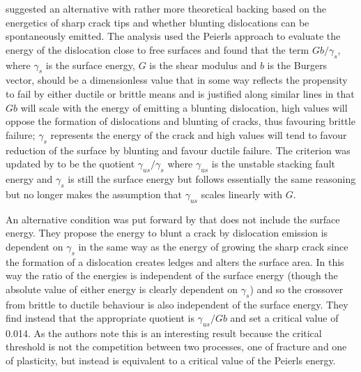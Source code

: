 


\citet{rice1974} suggested an alternative with rather more theoretical backing based on the energetics of sharp crack tips and whether blunting dislocations can be spontaneously emitted. The analysis used the Peierls approach to evaluate the energy of the dislocation close to free surfaces and found that the term $Gb/\gamma_s$, where $\gamma_s$ is the surface energy, $G$ is the shear modulus and $b$ is the Burgers vector, should be a dimensionless value that in some way reflects the propensity to fail by either ductile or brittle means and is justified along similar lines in that $Gb$ will scale with the energy of emitting a blunting dislocation, high values will oppose the formation of dislocations and blunting of cracks, thus favouring brittle failure; $\gamma_s$ represents the energy of the crack and high values will tend to favour reduction of the surface by blunting and favour ductile failure. The criterion was updated by \citet{Rice1992} to be the quotient $\gamma_{us}/ \gamma_s$ where $\gamma_{us}$ is the unstable stacking fault energy and $\gamma_s$ is still the surface energy but follows essentially the same reasoning but no longer makes the assumption that $\gamma_{us}$ scales linearly with $G$.

An alternative condition was put forward by \citet{Zhou1994} that does not include the surface energy. They propose the energy to blunt a crack by dislocation emission is dependent on $\gamma_s$ in the same way as the energy of growing the sharp crack since the formation of a dislocation creates ledges and alters the surface area. In this way the ratio of the energies is independent of the surface energy (though the absolute value of either energy is clearly dependent on $\gamma_s$) and so the crossover from brittle to ductile behaviour is also independent of the surface energy. They find instead that the appropriate quotient is $\gamma_{us} / Gb$ and set a critical value of 0.014. As the authors note this is an interesting result because the critical threshold is not the competition between two processes, one of fracture and one of plasticity, but instead is equivalent to a critical value of the Peierls energy.

